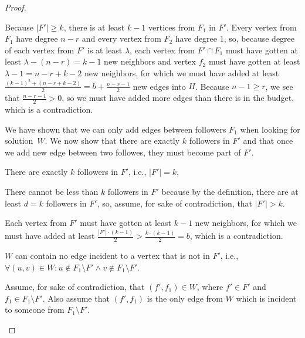 \begin{proof}
\begin{subproof}
        Because $|F'| \geq k$, there is at least $k-1$ vertices from $F_1$ in $F'$.
        Every vertex from $F_1$ have degree $n-r$ and every vertex from $F_2$ have degree $1$, so,
        because degree of each vertex from $F'$ is at least $\lambda$,
        each vertex from $F' \cap F_1$ must have gotten at least $\lambda - (n - r) = k - 1$ new neighbors and
        vertex $f_2$ must have gotten at least $\lambda - 1 = n - r + k - 2$ new neighbors,
        for which we must have added at least
        $\frac{(k - 1)^2 + (n -r + k - 2)}{2} = b + \frac{n - r - 1}{2}$ new edges into $H$.
        Because $n-1 \geq r$, we see that $\frac{n - r - 1}{2} > 0$,
        so we must have added more edges than there is in the budget, which is a contradiction.
    \end{subproof}

    We have shown that we can only add edges between followers $F_1$ when looking for solution~$W$.
    We now show that there are exactly $k$ followers in $F'$ and that
    once we add new edge between two followes, they must become part of $F'$.

    \begin{lemma}
        There are exactly $k$ followers in $F'$, i.e., $|F'| = k$,
    \end{lemma}
    \begin{subproof}
        There cannot be less than $k$ followers in $F'$ because by the definition,
        there are at least $d = k$ followers in $F'$, so, assume, for sake of contradiction, that $|F'| > k$.

        Each vertex from $F'$ must have gotten at least $k - 1$ new neighbors,
        for which we must have added at least $\frac{|F'| \cdot (k-1)}{2} > \frac{k \cdot (k-1)}{2} = b$,
        which is a contradiction.
    \end{subproof}

    \begin{lemma}\label{lemmaInProof2}
        $W$ can contain no edge incident to a vertex that is not in $F'$, i.e.,
        $\forall (u,v) \in W \colon u \notin F_1 \setminus F' \wedge v \notin F_1 \setminus F'$.
    \end{lemma}
    \begin{subproof}
        Assume, for sake of contradiction, that $(f',f_1) \in W$, where $f' \in F'$ and $f_1 \in F_1 \setminus F'$.
        Also assume that $(f',f_1)$ is the only edge from $W$ which is incident to someone from $F_1 \setminus F'$.
    

\end{subproof}
\end{proof}

